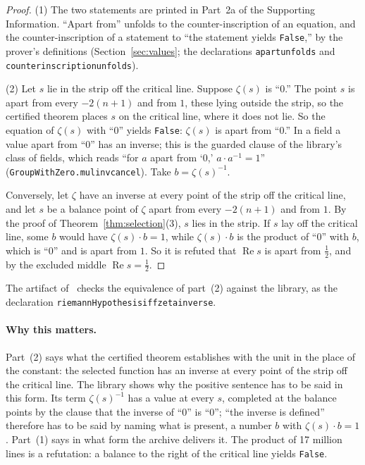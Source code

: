 \documentclass[11pt]{article}
\theoremstyle{definition}
\theoremstyle{remark}
\newcommand{\re}{\operatorname{Re}}
\DeclareRobustCommand{\lean}[1]{{\renewcommand{\_}{\textunderscore\allowbreak}\texttt{#1}}}
\newcommand{\False}{\lean{False}}
\begin{document}
\begin{proof}
(1) The two statements are printed in Part~2a of the Supporting Information. ``Apart from'' unfolds to the counter-inscription of an equation, and the counter-inscription of a statement to ``the statement yields \False,'' by the prover's definitions (Section~\ref{sec:values}; the declarations \lean{apart\_unfolds} and \lean{counter\_inscription\_unfolds}).

(2) Let $s$ lie in the strip off the critical line. Suppose $\zeta(s)$ is ``0.'' The point $s$ is apart from every $-2(n+1)$ and from $1$, these lying outside the strip, so the certified theorem places $s$ on the critical line, where it does not lie. So the equation of $\zeta(s)$ with ``0'' yields \False: $\zeta(s)$ is apart from ``0.'' In a field a value apart from ``0'' has an inverse; this is the guarded clause of the library's class of fields, which reads ``for $a$ apart from `0,' $a\cdot a^{-1}=1$'' (\lean{GroupWithZero.mul\_inv\_cancel}). Take $b=\zeta(s)^{-1}$.

Conversely, let $\zeta$ have an inverse at every point of the strip off the critical line, and let $s$ be a balance point of $\zeta$ apart from every $-2(n+1)$ and from $1$. By the proof of Theorem~\ref{thm:selection}(3), $s$ lies in the strip. If $s$ lay off the critical line, some $b$ would have $\zeta(s)\cdot b=1$, while $\zeta(s)\cdot b$ is the product of ``0'' with $b$, which is ``0'' and is apart from $1$. So it is refuted that $\re s$ is apart from $\tfrac12$, and by the excluded middle $\re s=\tfrac12$.
\end{proof}

\noindent The artifact of~\citet{tv} checks the equivalence of part~(2) against the library, as the declaration \lean{riemannHypothesis\_iff\_zeta\_inverse}.

\paragraph{Why this matters.} Part~(2) says what the certified theorem establishes with the unit in the place of the constant: the selected function has an inverse at every point of the strip off the critical line. The library shows why the positive sentence has to be said in this form. Its term $\zeta(s)^{-1}$ has a value at every $s$, completed at the balance points by the clause that the inverse of ``0'' is ``0''; ``the inverse is defined'' therefore has to be said by naming what is present, a number $b$ with $\zeta(s)\cdot b=1$. Part~(1) says in what form the archive delivers it. The product of 17 million lines is a refutation: a balance to the right of the critical line yields \False.
\end{document}
